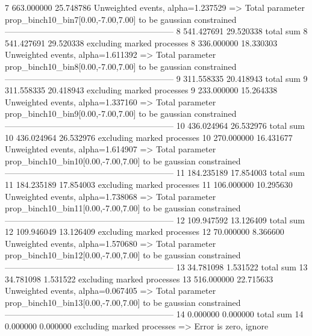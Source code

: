 7          663.000000      25.748786       Unweighted events, alpha=1.237529
  => Total parameter prop_binch10_bin7[0.00,-7.00,7.00] to be gaussian constrained
------------------------------------------------------------
8          541.427691      29.520338       total sum                     
8          541.427691      29.520338       excluding marked processes    
8          336.000000      18.330303       Unweighted events, alpha=1.611392
  => Total parameter prop_binch10_bin8[0.00,-7.00,7.00] to be gaussian constrained
------------------------------------------------------------
9          311.558335      20.418943       total sum                     
9          311.558335      20.418943       excluding marked processes    
9          233.000000      15.264338       Unweighted events, alpha=1.337160
  => Total parameter prop_binch10_bin9[0.00,-7.00,7.00] to be gaussian constrained
------------------------------------------------------------
10         436.024964      26.532976       total sum                     
10         436.024964      26.532976       excluding marked processes    
10         270.000000      16.431677       Unweighted events, alpha=1.614907
  => Total parameter prop_binch10_bin10[0.00,-7.00,7.00] to be gaussian constrained
------------------------------------------------------------
11         184.235189      17.854003       total sum                     
11         184.235189      17.854003       excluding marked processes    
11         106.000000      10.295630       Unweighted events, alpha=1.738068
  => Total parameter prop_binch10_bin11[0.00,-7.00,7.00] to be gaussian constrained
------------------------------------------------------------
12         109.947592      13.126409       total sum                     
12         109.946049      13.126409       excluding marked processes    
12         70.000000       8.366600        Unweighted events, alpha=1.570680
  => Total parameter prop_binch10_bin12[0.00,-7.00,7.00] to be gaussian constrained
------------------------------------------------------------
13         34.781098       1.531522        total sum                     
13         34.781098       1.531522        excluding marked processes    
13         516.000000      22.715633       Unweighted events, alpha=0.067405
  => Total parameter prop_binch10_bin13[0.00,-7.00,7.00] to be gaussian constrained
------------------------------------------------------------
14         0.000000        0.000000        total sum                     
14         0.000000        0.000000        excluding marked processes    
  => Error is zero, ignore      
